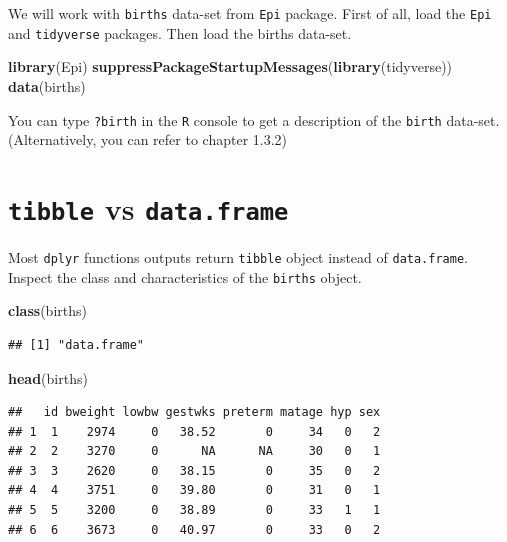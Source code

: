 \documentclass[
]{book}
\newenvironment{Shaded}{\begin{snugshade}}{\end{snugshade}}
\newcommand{\FunctionTok}[1]{\textcolor[rgb]{0.13,0.29,0.53}{\textbf{#1}}}
\newcommand{\NormalTok}[1]{#1}
\begin{document}
We will work with \texttt{births} data-set from \texttt{Epi} package.
First of all, load the \texttt{Epi} and \texttt{tidyverse} packages.
Then load the births data-set.

\begin{Shaded}
\begin{Highlighting}[]
\FunctionTok{library}\NormalTok{(Epi)}
\FunctionTok{suppressPackageStartupMessages}\NormalTok{(}\FunctionTok{library}\NormalTok{(tidyverse))}
\FunctionTok{data}\NormalTok{(births)}
\end{Highlighting}
\end{Shaded}

You can type \texttt{?birth} in the \texttt{R} console to get a description of the \texttt{birth} data-set. (Alternatively, you can refer to chapter 1.3.2)

\section{\texorpdfstring{\texttt{tibble} vs \texttt{data.frame}}{tibble vs data.frame}}\label{tibble-vs-data.frame}

Most \texttt{dplyr} functions outputs return \texttt{tibble} object instead of
\texttt{data.frame}.
Inspect the class and characteristics of the \texttt{births} object.

\begin{Shaded}
\begin{Highlighting}[]
\FunctionTok{class}\NormalTok{(births)}
\end{Highlighting}
\end{Shaded}

\begin{verbatim}
## [1] "data.frame"
\end{verbatim}

\begin{Shaded}
\begin{Highlighting}[]
\FunctionTok{head}\NormalTok{(births)}
\end{Highlighting}
\end{Shaded}

\begin{verbatim}
##   id bweight lowbw gestwks preterm matage hyp sex
## 1  1    2974     0   38.52       0     34   0   2
## 2  2    3270     0      NA      NA     30   0   1
## 3  3    2620     0   38.15       0     35   0   2
## 4  4    3751     0   39.80       0     31   0   1
## 5  5    3200     0   38.89       0     33   1   1
## 6  6    3673     0   40.97       0     33   0   2
\end{verbatim}
\end{document}

